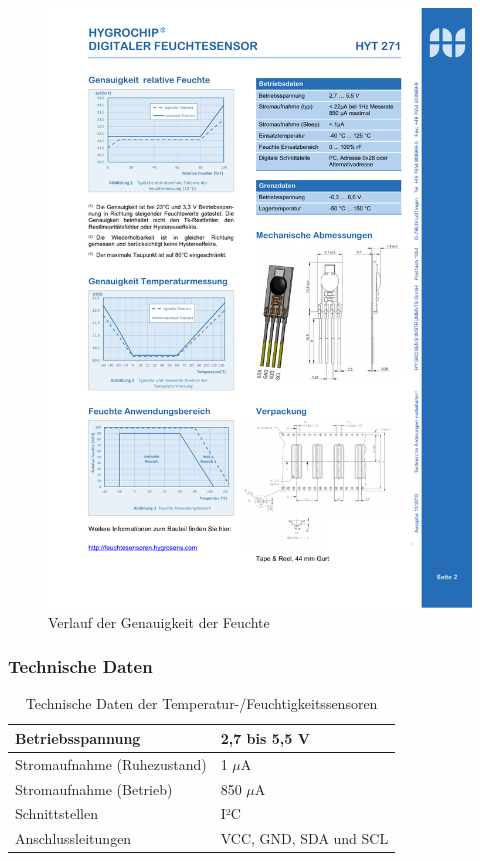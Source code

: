 				\begin{figure}[H]
					\centering
					\includegraphics{./Grafiken/Genauigkeit_Feuchte}
					\caption[Verlauf der Genauigkeit der Feuchte]{Verlauf der Genauigkeit der Feuchte\protect\footnotemark}
					\label{fig:Genauigkeit_Feuchte}
				\end{figure}
				
			\subsubsection{Technische Daten}
				\begin{table}[H]
					\centering
					\begin{tabular}{|l|l|}
					\hline Betriebsspannung & 2,7 bis 5,5 V \\
					\hline Stromaufnahme (Ruhezustand) & 1 $\mu$A \\
					\hline Stromaufnahme (Betrieb) & 850 $\mu$A \\
					\hline Schnittstellen & I²C \\
					\hline Anschlussleitungen & VCC, GND, SDA und SCL\\
					\hline
					\end{tabular}
					\caption{Technische Daten der Temperatur-/Feuchtigkeitssensoren}
					\label{table:TechHYT}
				\end{table}
